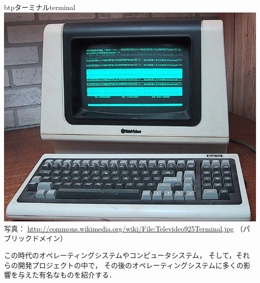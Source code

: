\begin{itemize}
  \begin{myfig}{btp}{ターミナル}{terminal}
    \includegraphics[scale=0.25]
     {Photo/724px-Televideo925Terminal.jpeg}\\
     {\small 写真：
       \url{http://commons.wikimedia.org/wiki/File:Televideo925Terminal.jpg}
       （パブリックドメイン）}
  \end{myfig}
\end{itemize}

この時代のオペレーティングシステムやコンピュータシステム，
そして，それらの開発プロジェクトの中で，
その後のオペレーティングシステムに多くの影響を与えた有名なものを紹介する．

